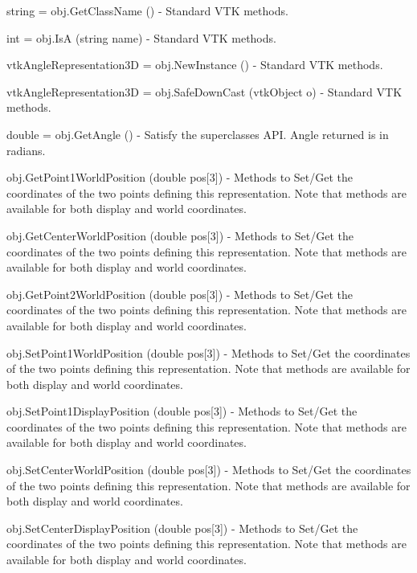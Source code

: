 \begin{DoxyItemize}
\item {\ttfamily string = obj.\-Get\-Class\-Name ()} -\/ Standard V\-T\-K methods.  
\item {\ttfamily int = obj.\-Is\-A (string name)} -\/ Standard V\-T\-K methods.  
\item {\ttfamily vtk\-Angle\-Representation3\-D = obj.\-New\-Instance ()} -\/ Standard V\-T\-K methods.  
\item {\ttfamily vtk\-Angle\-Representation3\-D = obj.\-Safe\-Down\-Cast (vtk\-Object o)} -\/ Standard V\-T\-K methods.  
\item {\ttfamily double = obj.\-Get\-Angle ()} -\/ Satisfy the superclasses A\-P\-I. Angle returned is in radians.  
\item {\ttfamily obj.\-Get\-Point1\-World\-Position (double pos\mbox{[}3\mbox{]})} -\/ Methods to Set/\-Get the coordinates of the two points defining this representation. Note that methods are available for both display and world coordinates.  
\item {\ttfamily obj.\-Get\-Center\-World\-Position (double pos\mbox{[}3\mbox{]})} -\/ Methods to Set/\-Get the coordinates of the two points defining this representation. Note that methods are available for both display and world coordinates.  
\item {\ttfamily obj.\-Get\-Point2\-World\-Position (double pos\mbox{[}3\mbox{]})} -\/ Methods to Set/\-Get the coordinates of the two points defining this representation. Note that methods are available for both display and world coordinates.  
\item {\ttfamily obj.\-Set\-Point1\-World\-Position (double pos\mbox{[}3\mbox{]})} -\/ Methods to Set/\-Get the coordinates of the two points defining this representation. Note that methods are available for both display and world coordinates.  
\item {\ttfamily obj.\-Set\-Point1\-Display\-Position (double pos\mbox{[}3\mbox{]})} -\/ Methods to Set/\-Get the coordinates of the two points defining this representation. Note that methods are available for both display and world coordinates.  
\item {\ttfamily obj.\-Set\-Center\-World\-Position (double pos\mbox{[}3\mbox{]})} -\/ Methods to Set/\-Get the coordinates of the two points defining this representation. Note that methods are available for both display and world coordinates.  
\item {\ttfamily obj.\-Set\-Center\-Display\-Position (double pos\mbox{[}3\mbox{]})} -\/ Methods to Set/\-Get the coordinates of the two points defining this representation. Note that methods are available for both display and world coordinates.  

\end{DoxyItemize}

